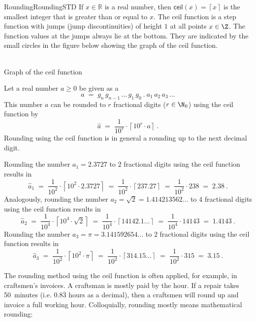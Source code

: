\begin{MXContent}{Rounding}{Rounding}{STD}
If $x\in \mathbb{R}$ is a real number, then $\textsf{ceil}(x)=\left\lceil{ x }\right\rceil$ is the smallest integer 
that is greater than or equal to $x$. The \textsf{ceil} function is a step function with jumps (jump discontinuities) of height $1$ at all points  $x\in\Z$. The function values at the jumps always lie at the bottom. 
They are indicated by the small circles in the figure below showing the graph of the \textsf{ceil} function. 

\begin{center}
\\
Graph of the \textsf{ceil} function
\end{center}

Let a real number $a\geq 0$ be given as a 
$$
a \;=\; g_n\, g_{n-1}\, \ldots\, g_1\, g_0\: .\: a_1\,a_2\, a_3\, \ldots
$$
This number $a$ can be rounded to $r$ fractional digits ($r\in\N_0$) using the \textsf{ceil} function by
$$
\hat{a} \;=\; \frac{1}{10^{r}}\cdot \left\lceil{ 10^{r}\cdot a }\right\rceil \: .
$$
Rounding using the \textsf{ceil} function is in general a rounding up to the next decimal digit.

\begin{MExample}
Rounding the number $a_1=2.3727$ to $2$ fractional digits using the \textsf{ceil} function results in
$$
\hat{a}_{1}\;=\; \frac{1}{10^{2}}\cdot \left\lceil{ 10^{2}\cdot 2.3727}\right\rceil\; =\; \frac{1}{10^{2}}\cdot \left\lceil{ 237.27}\right\rceil \;=\; \frac{1}{10^{2}}\cdot 238 \;=\; 2.38\: .
$$
Analogously, rounding the number $a_{2}=\sqrt{2}=1.414213562\ldots$ to $4$ fractional digits using the \textsf{ceil} function results in
$$
\hat{a}_{2}\; =\; \frac{1}{10^{4}}\cdot \left\lceil{ 10^{4}\cdot \sqrt{2}}\right\rceil\; =\; \frac{1}{10^{4}}\cdot \left\lceil{ 14142.1\ldots}\right\rceil \;=\; \frac{1}{10^{4}}\cdot 14143\; =\; 1.4143\: .
$$
Rounding the number $a_{3}=\pi=3.141592654\ldots$ to $2$ fractional digits using the \textsf{ceil} function results in
$$
\hat{a}_{3}\; =\; \frac{1}{10^{2}}\cdot \left\lceil{ 10^{2}\cdot \pi }\right\rceil\; =\; \frac{1}{10^{2}}\cdot \left\lceil{ 314.15\ldots }\right\rceil\; =\;\frac{1}{10^{2}}\cdot 315 \;=\; 3.15\: .
$$
\end{MExample}

The rounding method using the \textsf{ceil} function is often applied, for example, in craftsmen's invoices. 
A craftsman is mostly paid by the hour. If a repair takes 50~minutes (i.e. $0.8\overline{3}$ hours as 
a decimal), then a craftsmen will round up and invoice a full working hour. Colloquially, rounding 
mostly means mathematical rounding:


\end{MXContent}
